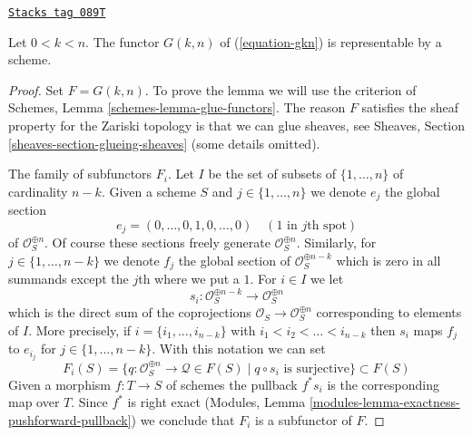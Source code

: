 \begin{lemma}
\label{constructions-lemma-gkn-representable}
\href{https://stacks.math.columbia.edu/tag/089T}{\texttt{Stacks tag 089T}}

Let $0 < k < n$.
The functor $G(k, n)$ of (\ref{equation-gkn}) is representable by a scheme.
\end{lemma}

\begin{proof}
Set $F = G(k, n)$. To prove the lemma we will use the criterion of
Schemes, Lemma \ref{schemes-lemma-glue-functors}.
The reason $F$ satisfies the sheaf property for the
Zariski topology is that we can glue sheaves, see Sheaves,
Section \ref{sheaves-section-glueing-sheaves} (some details omitted).

\medskip\noindent
The family of subfunctors $F_i$.
Let $I$ be the set of subsets of $\{1, \ldots, n\}$ of cardinality $n - k$.
Given a scheme $S$ and $j \in \{1, \ldots, n\}$ we denote $e_j$
the global section
$$
e_j = (0, \ldots, 0, 1, 0, \ldots, 0)\quad(1\text{ in }j\text{th spot})
$$
of $\mathcal{O}_S^{\oplus n}$. Of course these sections freely generate
$\mathcal{O}_S^{\oplus n}$. Similarly, for $j \in \{1, \ldots, n - k\}$
we denote $f_j$ the global section of $\mathcal{O}_S^{\oplus n - k}$
which is zero in all summands except the $j$th where we put a $1$.
For $i \in I$ we let
$$
s_i : \mathcal{O}_S^{\oplus n - k} \longrightarrow \mathcal{O}_S^{\oplus n}
$$
which is the direct sum of the coprojections
$\mathcal{O}_S \to \mathcal{O}_S^{\oplus n}$ corresponding to elements of $I$.
More precisely, if $i = \{i_1, \ldots, i_{n - k}\}$ with
$i_1 < i_2 < \ldots < i_{n - k}$
then $s_i$ maps $f_j$ to $e_{i_j}$ for $j \in \{1, \ldots, n - k\}$.
With this notation we can set
$$
F_i(S) = \{q : \mathcal{O}_S^{\oplus n} \to \mathcal{Q} \in F(S) \mid
q \circ s_i \text{ is surjective}\}
\subset F(S)
$$
Given a morphism $f : T \to S$ of schemes the pullback $f^*s_i$
is the corresponding map over $T$. Since $f^*$ is right exact
(Modules, Lemma \ref{modules-lemma-exactness-pushforward-pullback})
we conclude that $F_i$ is a subfunctor of $F$.


\end{proof}
